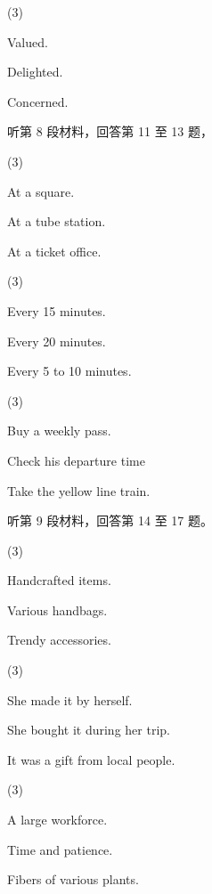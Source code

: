 \documentclass{英语试卷}
\begin{document}
\begin{choices}(3)
  \item Valued.
  \item Delighted.
  \item Concerned.
\end{choices}
\par 听第 8 段材料，回答第 11 至 13 题，\par
{}
\begin{choices}(3)
  \item At a square.
  \item At a tube station.
  \item At a ticket office.
\end{choices}
\begin{choices}(3)
  \item Every 15 minutes.
  \item Every 20 minutes.
  \item Every 5 to 10 minutes.
\end{choices}
\begin{choices}(3)
  \item Buy a weekly pass.
  \item Check his departure time
  \item Take the yellow line train.
\end{choices}
\par 听第 9 段材料，回答第 14 至 17 题。\par
{}
\begin{choices}(3)
  \item Handcrafted items.
  \item Various handbags.
  \item Trendy accessories.
\end{choices}
\begin{choices}(3)
  \item She made it by herself.
  \item She bought it during her trip.
  \item It was a gift from local people.
\end{choices}
\begin{choices}(3)
  \item A large workforce.
  \item Time and patience.
  \item Fibers of various plants.
\end{choices}
\end{document}

